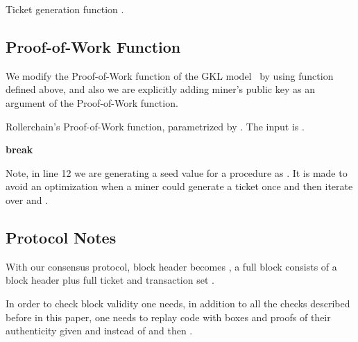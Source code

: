 \documentclass[conference,compsoc]{IEEEtran}
\begin{document}
\begin{algorithm}[H]
\caption{Ticket generation function .}
\label{algo_ticket_generation}
\begin{algorithmic}[1]


\State 
\State 

\State 
\State 
\State 
\State 
\State 
\EndFor

\State 
\State 
\State \Return  
\EndFunction

\end{algorithmic}
\end{algorithm}

\subsection{Proof-of-Work Function}

We modify the Proof-of-Work function of the GKL model~\cite{garay2015bitcoin} by using  function defined above, and also we are explicitly adding miner's public key  as an argument of the Proof-of-Work function.


\begin{algorithm}[H]
\caption{Rollerchain's Proof-of-Work function, parametrized by . The input is .}
\label{algo_rc_pow}
\begin{algorithmic}[1]
\State 
\If{}
	\State 
\Else
	\State 
	\State 
\EndIf
\State 
\State 

\While{}
\State 
\State 
\State 
\If{}
\State 
\State \textbf{break}
\EndIf
\State 
\EndWhile
\State 
\State \Return 
\EndFunction
\end{algorithmic}
\end{algorithm}

Note, in line 12 we are generating a seed value for a  procedure as . It is made to avoid an optimization when a miner could generate a ticket once and then iterate over  and . 


\subsection{Protocol Notes}

With our consensus protocol, block header becomes , a full block consists of a block header plus full ticket  and transaction set .

In order to check block validity one needs, in addition to all the checks described before in this paper, one needs to replay  code with boxes and proofs of their authenticity given and  instead of  and then .
\end{document}
